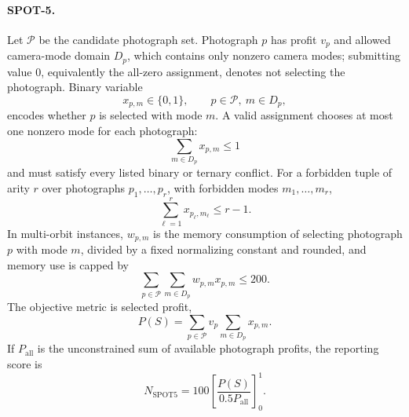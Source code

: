 \documentclass[]{mosi}
\begin{document}
\paragraph{SPOT-5.} Let \(\mathcal{P}\) be the candidate photograph set. Photograph \(p\) has profit \(v_p\) and allowed camera-mode domain \(D_p\), which contains only nonzero camera modes; submitting value \(0\), equivalently the all-zero assignment, denotes not selecting the photograph. Binary variable
\[
  x_{p,m}\in\{0,1\},\qquad p\in\mathcal{P},\ m\in D_p,
\]
encodes whether \(p\) is selected with mode \(m\). A valid assignment chooses at most one nonzero mode for each photograph:
\[
  \sum_{m\in D_p}x_{p,m}\le 1
\]
and must satisfy every listed binary or ternary conflict. For a forbidden tuple of arity \(r\) over photographs \(p_1,\ldots,p_r\), with forbidden modes \(m_1,\ldots,m_r\),
\[
  \sum_{\ell=1}^{r}x_{p_\ell,m_\ell}\le r-1.
\]
In multi-orbit instances, \(w_{p,m}\) is the memory consumption of selecting photograph \(p\) with mode \(m\), divided by a fixed normalizing constant and rounded, and memory use is capped by
\[
  \sum_{p\in\mathcal{P}}\sum_{m\in D_p} w_{p,m}x_{p,m}\le 200.
\]
The objective metric is selected profit,
\[
  P(S)=\sum_{p\in\mathcal{P}}v_p\sum_{m\in D_p}x_{p,m}.
\]
If \(P_{\mathrm{all}}\) is the unconstrained sum of available photograph profits, the reporting score is
\[
  N_{\mathrm{SPOT5}}=100\left[\frac{P(S)}{0.5P_{\mathrm{all}}}\right]_0^1.
\]
\end{document}
